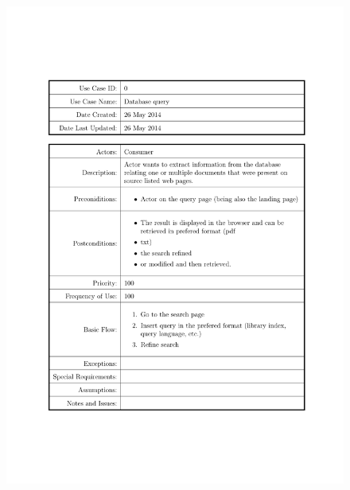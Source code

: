 \documentclass[a4paper]{tufte-book}
\begin{document}
\begin{figure}[h] \includegraphics[width=\linewidth]{Requirements/UseCases/000_Query.pdf}\end{figure}
\end{document}
